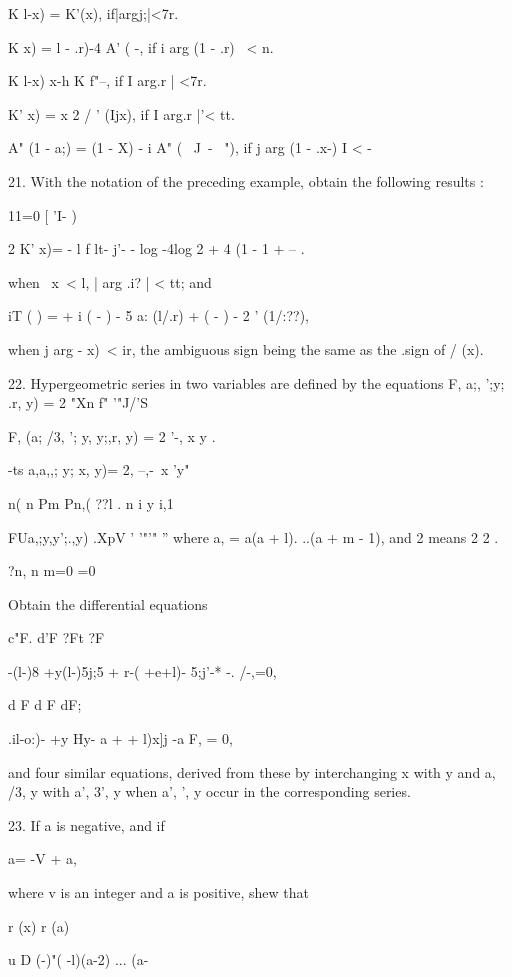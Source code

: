 K l-x) = K'(x), if|argj;|<7r.

K x) = l - .r)-4 A' ( -, if i arg (1 - .r) \ < n.

K l-x) x-h K f"--, if I arg.r | <7r.

K' x) = x 2 / ' (Ijx), if I arg.r |'< tt.

A" (1 - a;) = (1 - X) - i A" ( \ J\ - \ "), if j arg (1 - .x-) I < -

21. With the notation of the preceding example, obtain the following
results :

11=0 [ 'I- )

2 K' x)= - l f lt- j'- - log -4log 2 + 4 (1 - 1 + -- .

when \ x\ < l, | arg .i? | < tt; and

iT ( ) = + i ( - ) - 5 a: (l/.r) + ( - ) - 2 ' (1/:??),

when j arg - x)\ < ir, the ambiguous sign being the same as the .sign
of / (x).


%
%

22. Hypergeometric series in two variables are defined by the
equations F, a;, ';y; .r, y) = 2 "Xn f" '"J/'S

F, (a; /3, '; y, y;,r, y) = 2 '-, x y .

-ts a,a,,; y; x, y)= 2, --,-\ x 'y"

 n( n Pm Pn,( ??l . n i y i,1

FUa,;y,y';.,y) .XpV ' '"'" '' where a, = a(a + l). ..(a + m - 1), and
2 means 2 2 .

?n, n m=0 =0

Obtain the differential equations

c"F. d'F ?Ft ?F

-(l-)8 +y(l-)5j;5 + r-( +e+l)- 5;j'-* -. /-,=0,

d F d F dF;

.il-o:)- +y Hy- a + + l)x]j -a F, = 0,

and four similar equations, derived from these by interchanging x with
y and a, /3, y with a', 3', y when a', ', y occur in the corresponding
series.

 23. If a is negative, and if

a= -V + a,

where v is an integer and a is positive, shew that

r (x) r (a)

u D (-)"( -l)(a-2) ... (a-%

